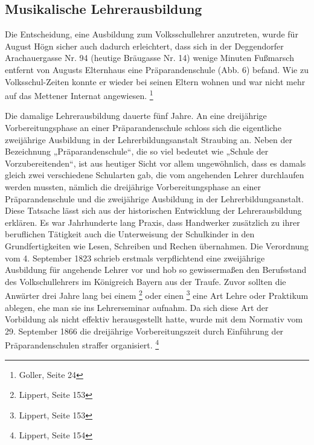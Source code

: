 \subsection{Musikalische Lehrerausbildung}

Die Entscheidung, eine Ausbildung
zum Volksschullehrer anzutreten, wurde für August Högn sicher auch
dadurch erleichtert, dass sich in der Deggendorfer Arachauergasse Nr.
94 (heutige Bräugasse Nr. 14) wenige Minuten Fußmarsch entfernt von
Augusts Elternhaus eine Präparandenschule (Abb. 6) befand. Wie zu
Volksschul-Zeiten konnte er wieder bei seinen Eltern wohnen und war
nicht mehr auf das Mettener Internat angewiesen. \footnote{Goller,
Seite 24}

Die damalige Lehrerausbildung dauerte fünf Jahre. An eine dreijährige
Vorbereitungsphase an einer Präparandenschule schloss sich die
eigentliche zweijährige Ausbildung in der Lehrerbildungsanstalt
Straubing an. Neben der Bezeichnung „Präparandenschule“, die so viel
bedeutet wie „Schule der Vorzubereitenden“, ist aus heutiger Sicht vor
allem ungewöhnlich, dass es damals gleich zwei verschiedene Schularten
gab, die vom angehenden Lehrer durchlaufen werden mussten, nämlich die
dreijährige Vorbereitungsphase an einer Präparandenschule und die
zweijährige Ausbildung in der Lehrerbildungsanstalt. Diese Tatsache
lässt sich aus der historischen Entwicklung der Lehrerausbildung
erklären. Es war Jahrhunderte lang Praxis, dass Handwerker zusätzlich
zu ihrer beruflichen Tätigkeit auch die Unterweisung der Schulkinder in
den Grundfertigkeiten wie Lesen, Schreiben und Rechen übernahmen. Die
Verordnung vom 4. September 1823 schrieb erstmals verpflichtend eine
zweijährige Ausbildung für angehende Lehrer vor und hob so
gewissermaßen den Berufsstand des Volkschullehrers im Königreich Bayern
aus der Traufe. Zuvor sollten die Anwärter drei Jahre lang bei einem
 \footnote{Lippert, Seite
153} oder einen \footnote{
Lippert, Seite 153} eine Art Lehre oder Praktikum ablegen, ehe man sie
ins Lehrerseminar aufnahm. Da sich diese Art der Vorbildung als nicht
effektiv herausgestellt hatte, wurde mit dem Normativ vom 29. September
1866 die dreijährige Vorbereitungszeit durch Einführung der
Präparandenschulen straffer organisiert. \footnote{Lippert, Seite 154}

